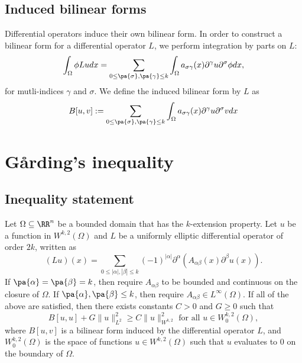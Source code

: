 \documentclass{scrartcl}
\begin{document}
\subsection{Induced bilinear forms}

Differential operators induce their own bilinear form.
In order to construct a bilinear form for a differential operator $L$,
we perform integration by parts on $L$:
\[
    \int_\Omega \phi Ludx = \sum_{0\leq \pa{\sigma},\pa{\gamma}\leq k}\int_\Omega a_{\sigma \gamma}(x)\partial^\gamma u \partial^\sigma \phi dx,
\]
for mutli-indices $\gamma$ and $\sigma$.
We define the induced bilinear form by $L$ as 
\[
    B[u,v] := \sum_{0\leq \pa{\sigma},\pa{\gamma}\leq k}\int_\Omega a_{\sigma \gamma}(x)\partial^\gamma u \partial^\sigma v dx
\]


\section{G\r{a}rding's inequality}

\subsection{Inequality statement}

\begin{theorem}
    \label{thm:gardinginequality}
    Let $\Omega \subseteq \RR^n$ be a bounded domain that 
    has the $k$-extension property.
    Let $u$ be a function in $W^{k,2}(\Omega)$ and 
    $L$ be a uniformly elliptic differential operator 
    of order $2k$, written as
    \[
        (Lu)(x)=\sum _{{0\leq |\alpha |,|\beta |\leq k}}(-1)^{{|\alpha |}}\partial^{{\alpha }}\left(A_{{\alpha \beta }}(x)\partial^{{\beta }}u(x)\right).
    \]
    If $\pa{\alpha} = \pa{\beta} = k$, then require $A_{\alpha\beta}$
    to be bounded and continuous on the closure of $\Omega$. 
    If $\pa{\alpha},\pa{\beta}\leq k$, then require 
    $A_{\alpha\beta}\in L^{\infty}(\Omega)$.
    If all of the above are satisfied, then 
    there exists constants $C>0$ and $G\geq 0$ such that
    \[
        B[u,u]+G\|u\|_{{L^{{2}}}}^{{2}}\geq C\|u\|_{{W^{k,2}}}^{{2}}{\text{ for all }}u\in W^{k,2}_0(\Omega),
    \]
    where $B[u,v]$ is a bilinear form induced by the differential operator 
    $L$, and $W^{k,2}_0(\Omega)$ is the space of functions $u\in W^{k,2}(\Omega)$ such that $u$ evaluates to $0$ on the boundary of $\Omega$.
\end{theorem}
\end{document}
